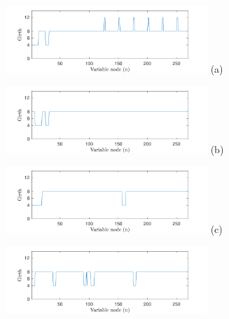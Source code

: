 \begin{figure}[tb]
	\centering
	\hspace{-0.25 cm}
	\begin{minipage}{.5\linewidth}
				\hspace{-0.35 cm}
		\includegraphics[width=3in]{pics/girth/girthds4-9.pdf}
		\vspace{-1cm}
			\center (a)
	\end{minipage}
\hfill
	\begin{minipage}{.5\linewidth}
		\hspace{-0.45 cm}
		\includegraphics[width=3in]{pics/girth/girthds3-5.pdf}
		\vspace{-1cm}
		\center (b)
	\end{minipage}
	\hspace{-0.2 cm}
	\begin{minipage}{.5\linewidth}
		\hspace{-0.45 cm}
		\includegraphics[width=3in]{pics/girth/girthds2-3.pdf}
		\vspace{-1cm}
		\center (c)
	\end{minipage}
\hfill
	\hspace{-0.2 cm}
\begin{minipage}{.5\linewidth}
		\hspace{-0.45 cm}
	\includegraphics[width=3in]{pics/girth/girthds3-4.pdf}

\end{minipage}
\end{figure}
